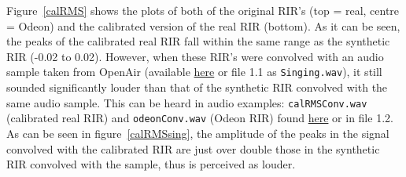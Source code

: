\documentclass[../../main.tex]{subfiles}
\begin{document}

			Figure~\ref{calRMS} shows the plots of both of the original \ac{RIR}'s (top = real, centre = Odeon) and the calibrated version of the real \ac{RIR} (bottom). As it can be seen, the peaks of the calibrated real \ac{RIR} fall within the same range as the synthetic \ac{RIR} (-0.02 to 0.02). However, when these \ac{RIR}'s were convolved with an audio sample taken from OpenAir \cite{singingSample} (available \href{http://lt669.github.io/pages/audioSamples.html}{here} or file 1.1 as \texttt{Singing.wav}), it still sounded significantly louder than that of the synthetic RIR convolved with the same audio sample. This can be heard in audio examples: \texttt{calRMSConv.wav} (calibrated real \ac{RIR}) and \texttt{odeonConv.wav} (Odeon \ac{RIR}) found \href{http://lt669.github.io/pages/audioSamples.html}{here} or in file 1.2. As can be seen in figure~\ref{calRMSsing}, the amplitude of the peaks in the signal convolved with the calibrated RIR are just over double those in the synthetic RIR convolved with the sample, thus is perceived as louder.
\end{document}

